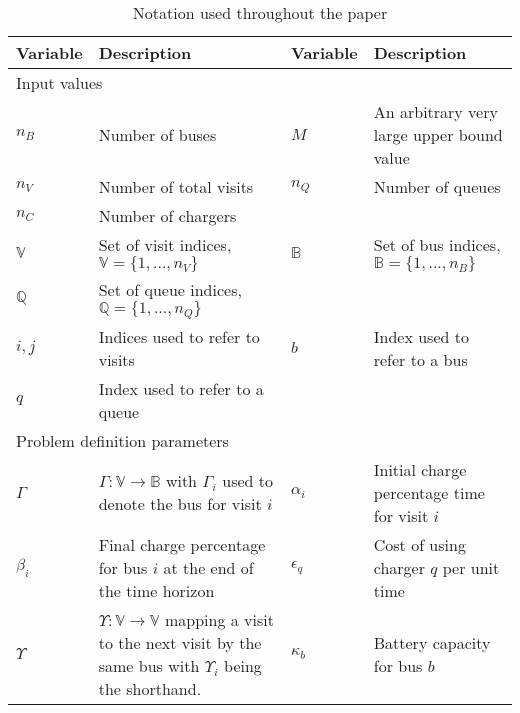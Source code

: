 \begin{table*}[!t]
	\caption{Notation used throughout the paper}
	\label{tab:variables}
	\centering
	\begin{tabular}{l l l l}
		\toprule
		\textbf{Variable} & \textbf{Description} & \textbf{Variable} & \textbf{Description} \\
		\toprule
		\multicolumn{4}{l}{Input values}                                  \\
			$n_B$         & Number of buses                     &
			$M$           & An arbitrary very large upper bound value \\
			$n_V$           & Number of total visits                    &
			$n_Q$           & Number of queues                        \\
			$n_C$ 			& Number of chargers \\
			$\mathbb{V}$  & Set of visit indices, $\mathbb{V} = \{1, ..., n_V\}$ 			  &
			$\mathbb{B}$  & Set of bus indices, $\mathbb{B} = \{1, ..., n_B\}$ 			 \\
			$\mathbb{Q}$  & Set of queue indices, $\mathbb{Q} = \{1, ..., n_Q\}$ \\
			$i,j$      	& Indices used to refer to visits &
			$b$ 		& Index used to refer to a bus \\
			$q$ 		& Index used to refer to a queue \\
		\hline
		\multicolumn{4}{l}{Problem definition parameters} \\
			$\Gamma$   & $\Gamma: \mathbb{V} \rightarrow \mathbb{B}$ with $\Gamma_i$ used to denote the bus for visit $i$                                   &
			$\alpha_i$   & Initial charge percentage time for visit $i$                       \\
			$\beta_i$    & Final charge percentage for bus $i$ at the end of the time horizon &
			$\epsilon_q$ & Cost of using charger $q$ per unit time                            \\
			$\Upsilon$   & $\Upsilon: \mathbb{V} \rightarrow \mathbb{V}$ mapping a visit to the next visit by the same bus with $\Upsilon_i$ being the shorthand. &
			$\kappa_b$   & Battery capacity for bus $b$                                       \\

\end{tabular}
\end{table*}
